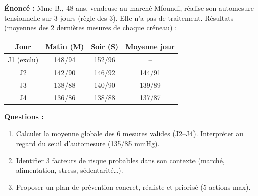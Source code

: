 \documentclass[11pt]{article}
\begin{document}
\begin{exoresolu}
\textbf{Énoncé :} Mme B., 48 ans, vendeuse au marché Mfoundi, réalise son automesure tensionnelle sur 3 jours (règle des 3). Elle n'a pas de traitement. Résultats (moyennes des 2 dernières mesures de chaque créneau) :
\begin{center}
\begin{tabular}{|c|c|c|c|}\hline
\textbf{Jour} & \textbf{Matin (M)} & \textbf{Soir (S)} & \textbf{Moyenne jour} \\ \hline
J1 (exclu) & 148/94 & 152/96 & -- \\ \hline
J2 & 142/90 & 146/92 & 144/91 \\ \hline
J3 & 138/88 & 140/90 & 139/89 \\ \hline
J4 & 136/86 & 138/88 & 137/87 \\ \hline
\end{tabular}
\end{center}
\textbf{Questions :}
\begin{enumerate}
\item Calculer la moyenne globale des 6 mesures valides (J2--J4). Interpréter au regard du seuil d'automesure (135/85 mmHg).
\item Identifier 3 facteurs de risque probables dans son contexte (marché, alimentation, stress, sédentarité\ldots).
\item Proposer un plan de prévention concret, réaliste et priorisé (5 actions max).
\end{enumerate}


\end{exoresolu}
\end{document}
